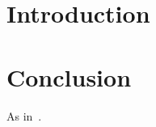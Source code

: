 \documentclass{article}
\begin{document}
\section{Introduction}
\lipsum[1-4]



\section{Conclusion}
\lipsum[9-12]
As in~\cite{knuth1984,lamport1994}.



\end{document}
